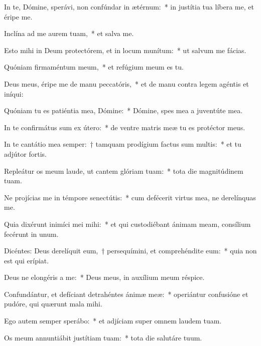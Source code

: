 \item In te, Dómine, sperávi, non confúndar in ætérnum:~* in justítia tua líbera me, et éripe me.

\item Inclína ad me aurem tuam,~* et salva me.

\item Esto mihi in Deum protectórem, et in locum munítum:~* ut salvum me fácias.

\item Quóniam firmaméntum meum,~* et refúgium meum es tu.

\item Deus meus, éripe me de manu peccatóris,~* et de manu contra legem agéntis et iníqui:

\item Quóniam tu es patiéntia mea, Dómine:~* Dómine, spes mea a juventúte mea.

\item In te confirmátus sum ex útero:~* de ventre matris meæ tu es protéctor meus.

\item In te cantátio mea semper:~† tamquam prodígium factus sum multis:~* et tu adjútor fortis.

\item Repleátur os meum laude, ut cantem glóriam tuam:~* tota die magnitúdinem tuam.

\item Ne projícias me in témpore senectútis:~* cum defécerit virtus mea, ne derelínquas me.

\item Quia dixérunt inimíci mei mihi:~* et qui custodiébant ánimam meam, consílium fecérunt in unum.

\item Dicéntes: Deus derelíquit eum,~† persequímini, et comprehéndite eum:~* quia non est qui erípiat.

\item Deus ne elongéris a me:~* Deus meus, in auxílium meum réspice.

\item Confundántur, et defíciant detrahéntes ánimæ meæ:~* operiántur confusióne et pudóre, qui quærunt mala mihi.

\item Ego autem semper sperábo:~* et adjíciam super omnem laudem tuam.

\item Os meum annuntiábit justítiam tuam:~* tota die salutáre tuum.

